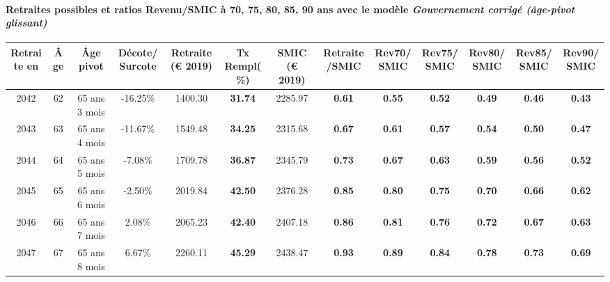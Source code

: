 \paragraph{Retraites possibles et ratios Revenu/SMIC à 70, 75, 80, 85, 90 ans avec le modèle \emph{Gouvernement corrigé (âge-pivot glissant)}}  
 
{ \scriptsize \begin{center} 
\begin{tabular}[htb]{|c|c||c|c||c|c||c||c|c|c|c|c|c|} 
\hline 
 Retraite en &  Âge &  Âge pivot &  Décote/Surcote &  Retraite (\euro{} 2019) &  Tx Rempl(\%) &  SMIC (\euro{} 2019) &  Retraite/SMIC &  Rev70/SMIC &  Rev75/SMIC &  Rev80/SMIC &  Rev85/SMIC &  Rev90/SMIC \\ 
\hline \hline 
 2042 &  62 &  65 ans 3 mois &  -16.25\% &  1400.30 &  {\bf 31.74} &  2285.97 &  {\bf {\color{red} 0.61}} &  {\bf {\color{red} 0.55}} &  {\bf {\color{red} 0.52}} &  {\bf {\color{red} 0.49}} &  {\bf {\color{red} 0.46}} &  {\bf {\color{red} 0.43}} \\ 
\hline 
 2043 &  63 &  65 ans 4 mois &  -11.67\% &  1549.48 &  {\bf 34.25} &  2315.68 &  {\bf {\color{red} 0.67}} &  {\bf {\color{red} 0.61}} &  {\bf {\color{red} 0.57}} &  {\bf {\color{red} 0.54}} &  {\bf {\color{red} 0.50}} &  {\bf {\color{red} 0.47}} \\ 
\hline 
 2044 &  64 &  65 ans 5 mois &  -7.08\% &  1709.78 &  {\bf 36.87} &  2345.79 &  {\bf {\color{red} 0.73}} &  {\bf {\color{red} 0.67}} &  {\bf {\color{red} 0.63}} &  {\bf {\color{red} 0.59}} &  {\bf {\color{red} 0.56}} &  {\bf {\color{red} 0.52}} \\ 
\hline 
 2045 &  65 &  65 ans 6 mois &  -2.50\% &  2019.84 &  {\bf 42.50} &  2376.28 &  {\bf {\color{red} 0.85}} &  {\bf {\color{red} 0.80}} &  {\bf {\color{red} 0.75}} &  {\bf {\color{red} 0.70}} &  {\bf {\color{red} 0.66}} &  {\bf {\color{red} 0.62}} \\ 
\hline 
 2046 &  66 &  65 ans 7 mois &  2.08\% &  2065.23 &  {\bf 42.40} &  2407.18 &  {\bf {\color{red} 0.86}} &  {\bf {\color{red} 0.81}} &  {\bf {\color{red} 0.76}} &  {\bf {\color{red} 0.72}} &  {\bf {\color{red} 0.67}} &  {\bf {\color{red} 0.63}} \\ 
\hline 
 2047 &  67 &  65 ans 8 mois &  6.67\% &  2260.11 &  {\bf 45.29} &  2438.47 &  {\bf {\color{red} 0.93}} &  {\bf {\color{red} 0.89}} &  {\bf {\color{red} 0.84}} &  {\bf {\color{red} 0.78}} &  {\bf {\color{red} 0.73}} &  {\bf {\color{red} 0.69}} \\ 
\hline 
\hline 
\end{tabular} 
\end{center} } 
